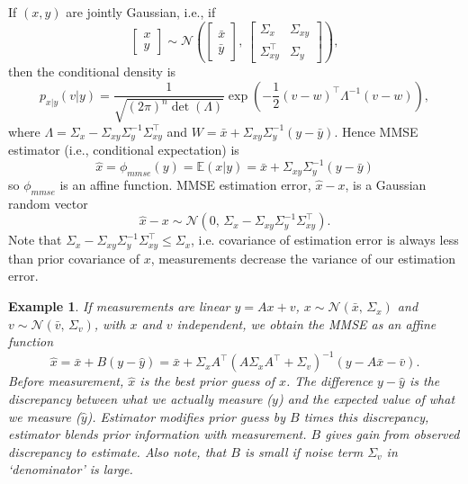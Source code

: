 \documentclass{article}[12pt]
\def\E{\E}
\def\y{\mathbf{y}}
\def \E{\mathbb E}
\newtheorem{example}{Example}
\begin{document}
If $(x,y)$ are jointly Gaussian, i.e., if
\begin{equation}
\begin{bmatrix}
x\\y
\end{bmatrix}
\sim\mathcal{N}
\left(
\begin{bmatrix}
\bar{x}\\\bar{y}
\end{bmatrix},\,
\begin{bmatrix}
\Sigma_x & \Sigma_{xy}\\
\Sigma_{xy}^\top & \Sigma_y
\end{bmatrix}
\right),
\end{equation}
then the conditional density is
\begin{equation}
p_{x|y}(v|y) = \frac{1}{\sqrt{(2\pi)^n \det(\Lambda)}} \exp
\left(
-\frac{1}{2} (v-w)^\top \Lambda^{-1}
(v-w)
\right),
\end{equation}
where $\Lambda=\Sigma_x - \Sigma_{xy}\Sigma_y^{-1}\Sigma_{xy}^\top$ and $W=\bar{x}+\Sigma_{xy} \Sigma_y^{-1}(y-\bar{y})$.
Hence MMSE estimator (i.e., conditional expectation) is
\begin{equation}
\hat{x} = \phi_{mmse}(y) = \E(x|y) = \bar{x}+\Sigma_{xy} \Sigma_y^{-1}(y-\bar{y})
\end{equation}
so $\phi_{mmse}$ is an affine function.
MMSE estimation error, $\hat{x}-x$, is a Gaussian random vector
\begin{equation}
\label{eq:mmse}
\hat{x}-x \sim\mathcal{N}
\left(
0,\,
\Sigma_x - \Sigma_{xy}\Sigma_y^{-1}\Sigma_{xy}^\top
\right).
\end{equation}
Note that $\Sigma_x - \Sigma_{xy}\Sigma_y^{-1}\Sigma_{xy}^\top \leq \Sigma_x$, i.e. covariance of estimation error is always less than prior covariance of $x$, measurements decrease the variance of our estimation error.
\begin{example}
If measurements are linear $y=Ax+v$, $x\sim\mathcal{N}(\bar{x},\,\Sigma_x)$ and $v\sim\mathcal{N}(\bar{v},\,\Sigma_v)$, with $x$ and $v$ independent, we obtain the MMSE as an affine function
\begin{equation}
\hat{x}=
\bar{x} + B(y-\hat{y})=
\bar{x} + \Sigma_x A^\top (A \Sigma_{x}A^\top + \Sigma_v)^{-1}(y-A\bar{x}-\bar{v}).
\end{equation}
Before measurement, $\hat{x}$ is the best prior guess of $x$.
The difference $y-\hat{y}$ is the discrepancy between what we actually measure ($y$) and the expected value of what we measure ($\hat{y}$). Estimator modifies prior guess by $B$ times this discrepancy, estimator blends prior information with measurement. $B$ gives gain from observed discrepancy to estimate.
Also note, that $B$ is small if noise term $\Sigma_v$ in `denominator' is large.
\end{example}
\end{document}
